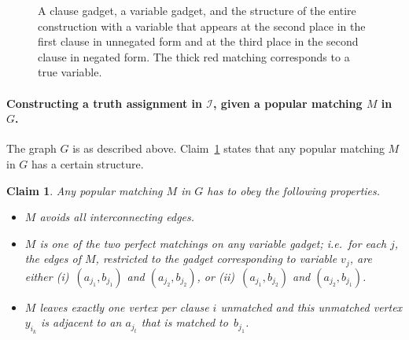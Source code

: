 \documentclass[11pt]{llncs}
\newtheorem{new-claim}{Claim}
\begin{document}
\begin{center}
\begin{figure}[h!]

\caption{A clause gadget, a variable gadget, and the structure of the entire construction with a variable that appears at the second place in the first clause in unnegated form and at the third place in the second clause in negated form. The thick red matching corresponds to a true variable.}
\label{fi:pop_np}
\end{figure}
\end{center}

\vspace*{-1cm}
	
\paragraph{Constructing a truth assignment in $\mathcal{I}$, given a popular matching $M$ in~$G$.}
The graph $G$ is as described above. Claim~\ref{clm1:appb} states that any popular matching $M$ in $G$ has a certain structure.
\begin{new-claim}
\label{clm1:appb}
Any popular matching $M$ in $G$ has to obey the following properties.
\begin{itemize}
	\item $M$ avoids all interconnecting edges.
	\item $M$ is one of the two perfect matchings on any variable gadget; i.e.\ for each $j$, the edges of $M$, restricted to the gadget 
corresponding to variable $v_j$, are either (i)~$(a_{j_1},b_{j_1})$ and $(a_{j_2},b_{j_2})$, or (ii)~$(a_{j_1},b_{j_2})$ and $(a_{j_2},b_{j_1})$.
	\item $M$ leaves exactly one vertex per clause $i$ unmatched and this unmatched vertex $y_{i_k}$ is adjacent to an $a_{j_t}$ that is 
matched to~$b_{j_1}$.
\end{itemize}
\end{new-claim}
\end{document}

